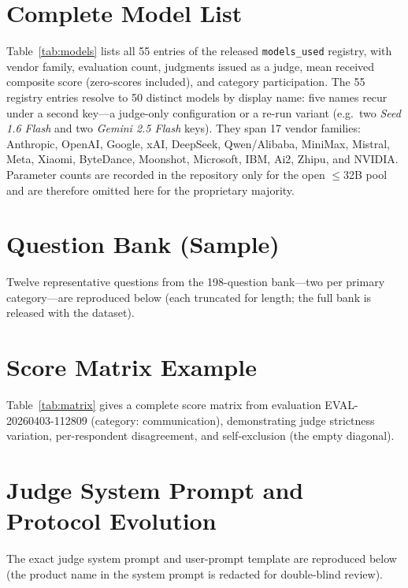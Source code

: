 \documentclass{article}
\begin{document}
\appendix
\section{Complete Model List}
\label{app:models}

Table~\ref{tab:models} lists all 55 entries of the released \texttt{models\_used} registry, with vendor family, evaluation count, judgments issued as a judge, mean received composite score (zero-scores included), and category participation. The 55 registry entries resolve to 50 distinct models by display name: five names recur under a second key---a judge-only configuration or a re-run variant (e.g.\ two \emph{Seed 1.6 Flash} and two \emph{Gemini 2.5 Flash} keys). They span 17 vendor families: Anthropic, OpenAI, Google, xAI, DeepSeek, Qwen/Alibaba, MiniMax, Mistral, Meta, Xiaomi, ByteDance, Moonshot, Microsoft, IBM, Ai2, Zhipu, and NVIDIA. Parameter counts are recorded in the repository only for the open $\leq$32B pool and are therefore omitted here for the proprietary majority.



\section{Question Bank (Sample)}

Twelve representative questions from the 198-question bank---two per primary category---are reproduced below (each truncated for length; the full bank is released with the dataset).



\section{Score Matrix Example}

Table~\ref{tab:matrix} gives a complete score matrix from evaluation EVAL-20260403-112809 (category: communication), demonstrating judge strictness variation, per-respondent disagreement, and self-exclusion (the empty diagonal).



\section{Judge System Prompt and Protocol Evolution}

The exact judge system prompt and user-prompt template are reproduced below (the product name in the system prompt is redacted for double-blind review).
\end{document}
